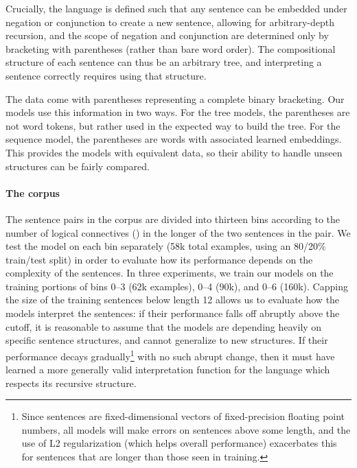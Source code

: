 Crucially, the language is defined such that any sentence can be embedded under negation or conjunction to create a new sentence, allowing for arbitrary-depth recursion, and the scope of negation and conjunction are determined only by bracketing with parentheses (rather than bare word order). The compositional structure of each sentence can thus be an arbitrary tree, and interpreting a sentence correctly requires using that structure.

The data come with parentheses representing a complete binary bracketing. Our models use this information in two ways. For the tree models, the parentheses are not word tokens, but rather used in the expected way to build the tree. For the sequence model, the parentheses are words with associated learned embeddings. This provides the models with equivalent data, so their ability to handle unseen structures can be fairly compared.

\paragraph{The corpus}
The sentence pairs in the corpus are divided into thirteen bins according to the number of logical connectives () in the longer of the two sentences in the pair. We test the model on each bin separately (58k total examples, using an 80/20\% train/test split) in order to evaluate how its performance depends on the complexity of the sentences. In three experiments, we train our models on the training portions of bins 0--3 (62k examples), 0--4 (90k), and 0--6 (160k). Capping the size of the training sentences below length 12 allows us to evaluate how the models interpret the sentences: if their performance falls off abruptly above the cutoff, it is reasonable to assume that the models are depending heavily on specific sentence structures, and cannot generalize to new structures. If their performance decays gradually\footnote{Since sentences are fixed-dimensional vectors of fixed-precision floating point numbers, all models will make errors on sentences above some length, and the use of L2 regularization (which helps overall performance) exacerbates this for sentences that are longer than those seen in training.} with no such abrupt change, then it must have learned a more generally valid interpretation function for the language which respects its recursive structure.



